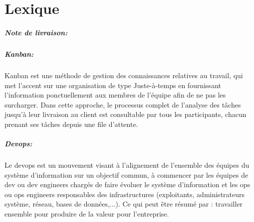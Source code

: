 \chapter*{Lexique}
\label{chap:Lexique}

\paragraph{Note de livraison: }

\paragraph{Kanban: }
Kanban est une méthode de gestion des connaissances relatives au travail, qui met l’accent sur une organisation de type Juste-à-temps en fournissant l'information ponctuellement aux membres de l'équipe afin de ne pas les surcharger. Dans cette approche, le processus complet de l'analyse des tâches jusqu’à leur livraison au client est consultable par tous les participants, chacun prenant ses tâches depuis une file d'attente.

\paragraph{Devops: }
Le devops est un mouvement visant à l'alignement de l'ensemble des équipes du système d'information sur un objectif commun, à commencer par les équipes de dev ou dev engineers chargés de faire évoluer le système d'information et les ops ou ops engineers responsables des infrastructures (exploitants, administrateurs système, réseau, bases de données,...). Ce qui peut être résumé par : travailler ensemble pour produire de la valeur pour l'entreprise.
